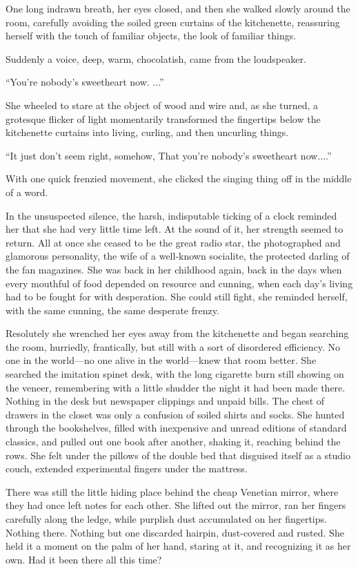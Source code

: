 \documentclass{novel}
\begin{document}
One long indrawn breath, her eyes closed, and then she walked slowly around the room, carefully avoiding the soiled green curtains of the kitchenette, reassuring herself with the touch of familiar objects, the look of familiar things.

Suddenly a voice, deep, warm, chocolatish, came from the loudspeaker.

“You’re nobody’s sweetheart now. ...”

She wheeled to stare at the object of wood and wire and, as she turned, a grotesque flicker of light momentarily transformed the fingertips below the kitchenette curtains into living, curling, and then uncurling things.

“It just don’t seem right, somehow, That you’re nobody’s sweetheart now....”

With one quick frenzied movement, she clicked the singing thing off in the middle of a word.

In the unsuspected silence, the harsh, indisputable ticking of a clock reminded her that she had very little time left. At the sound of it, her strength seemed to return. All at once she ceased to be the great radio star, the photographed and glamorous personality, the wife of a well-known socialite, the protected darling of the fan magazines. She was back in her childhood again, back in the days when every mouthful of food depended on resource and cunning, when each day’s living had to be fought for with desperation. She could still fight, she reminded herself, with the same cunning, the same desperate frenzy.

Resolutely she wrenched her eyes away from the kitchenette and began searching the room, hurriedly, frantically, but still with a sort of disordered efficiency. No one in the world—no one alive in the world—knew that room better. She searched the imitation spinet desk, with the long cigarette burn still showing on the veneer, remembering with a little shudder the night it had been made there. Nothing in the desk but newspaper clippings and unpaid bills. The chest of drawers in the closet was only a confusion of soiled shirts and socks. She hunted through the bookshelves, filled with inexpensive and unread editions of standard classics, and pulled out one book after another, shaking it, reaching behind the rows. She felt under the pillows of the double bed that disguised itself as a studio couch, extended experimental fingers under the mattress.

There was still the little hiding place behind the cheap Venetian mirror, where they had once left notes for each other. She lifted out the mirror, ran her fingers carefully along the ledge, while purplish dust accumulated on her fingertips. Nothing there. Nothing but one discarded hairpin, dust-covered and rusted. She held it a moment on the palm of her hand, staring at it, and recognizing it as her own. Had it been there all this time?
\end{document}
